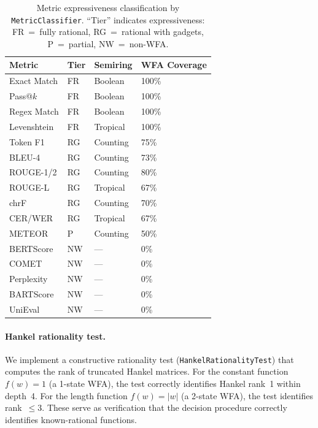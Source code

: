 \documentclass[11pt]{article}
\begin{document}
\begin{table}[t]
\centering
\caption{Metric expressiveness classification by \texttt{MetricClassifier}.
  ``Tier'' indicates expressiveness: FR~=~fully rational,
  RG~=~rational with gadgets, P~=~partial, NW~=~non-WFA.}
\label{tab:classifier-results}
\smallskip
\small
\begin{tabular}{@{}llll@{}}
\toprule
\textbf{Metric} & \textbf{Tier} & \textbf{Semiring} & \textbf{WFA Coverage} \\
\midrule
Exact Match      & FR & Boolean  & 100\% \\
Pass@$k$         & FR & Boolean  & 100\% \\
Regex Match      & FR & Boolean  & 100\% \\
Levenshtein      & FR & Tropical & 100\% \\
Token F1         & RG & Counting & 75\% \\
BLEU-4           & RG & Counting & 73\% \\
ROUGE-1/2        & RG & Counting & 80\% \\
ROUGE-L          & RG & Tropical & 67\% \\
chrF             & RG & Counting & 70\% \\
CER/WER          & RG & Tropical & 67\% \\
\midrule
METEOR           & P  & Counting & 50\% \\
BERTScore        & NW & ---      & 0\% \\
COMET            & NW & ---      & 0\% \\
Perplexity       & NW & ---      & 0\% \\
BARTScore        & NW & ---      & 0\% \\
UniEval          & NW & ---      & 0\% \\
\bottomrule
\end{tabular}
\end{table}

\paragraph{Hankel rationality test.}
We implement a constructive rationality test
(\texttt{HankelRationalityTest}) that computes the rank of truncated
Hankel matrices.  For the constant function $f(w) = 1$ (a 1-state WFA),
the test correctly identifies Hankel rank~1 within depth~4.
For the length function $f(w) = |w|$ (a 2-state WFA), the test
identifies rank~$\leq 3$.  These serve as verification that the
decision procedure correctly identifies known-rational functions.
\end{document}
